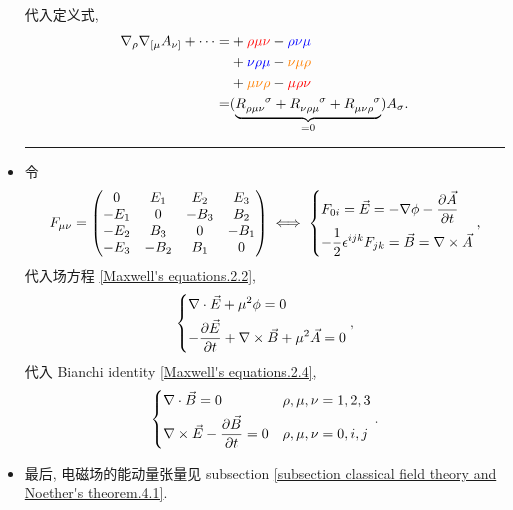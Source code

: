 \begin{itemize}
	\begin{tcolorbox}[title=calculation:]
		代入定义式,
		\begin{align}
			\nabla_\rho \nabla_{[\mu} A_{\nu]} + \cdots =& + \mathcolor{red}{\rho \mu \nu} - \mathcolor{blue}{\rho \nu \mu} \notag \\
			& + \mathcolor{blue}{\nu \rho \mu} - \mathcolor{orange}{\nu \mu \rho} \notag \\
			& + \mathcolor{orange}{\mu \nu \rho} - \mathcolor{red}{\mu \rho \nu} \notag \\
			=& (\underbrace{\tensor{R}{_{\rho \mu \nu}^\sigma} + \tensor{R}{_{\nu \rho \mu}^\sigma} + \tensor{R}{_{\mu \nu \rho}^\sigma}}_{= 0}) A_\sigma.
		\end{align}
	\end{tcolorbox}
	
	\noindent\rule[0.5ex]{\linewidth}{0.5pt} %
	
	\item 令
	\begin{equation}
		F_{\mu \nu} = \begin{pmatrix}
			0 & E_1 & E_2 & E_3 \\
			- E_1 & 0 & - B_3 & B_2 \\
			- E_2 & B_3 & 0 & - B_1 \\
			- E_3 & - B_2 & B_1 & 0
		\end{pmatrix} \iff \begin{dcases}
			F_{0 i} = \vec{E} = - \nabla \phi - \frac{\partial \vec{A}}{\partial t} \\
			- \frac{1}{2} \epsilon^{i j k} F_{j k} = \vec{B} = \nabla \times \vec{A}
		\end{dcases},
	\end{equation}
	代入场方程 \eqref{Maxwell's equations.2.2},
	\begin{equation}
		\begin{dcases}
			\nabla \cdot \vec{E} + \mu^2 \phi = 0 \\
			- \frac{\partial \vec{E}}{\partial t} + \nabla \times \vec{B} + \mu^2 \vec{A} = 0
		\end{dcases},
	\end{equation}
	代入 Bianchi identity \eqref{Maxwell's equations.2.4},
	\begin{equation}
		\begin{dcases}
			\nabla \cdot \vec{B} = 0 & \rho, \mu, \nu = 1, 2, 3 \\
			\nabla \times \vec{E} - \frac{\partial \vec{B}}{\partial t} = 0 & \rho, \mu, \nu = 0, i, j
		\end{dcases}.
	\end{equation}
	
	\item 最后, 电磁场的能动量张量见 subsection \ref{subsection classical field theory and Noether's theorem.4.1}.
\end{itemize}

